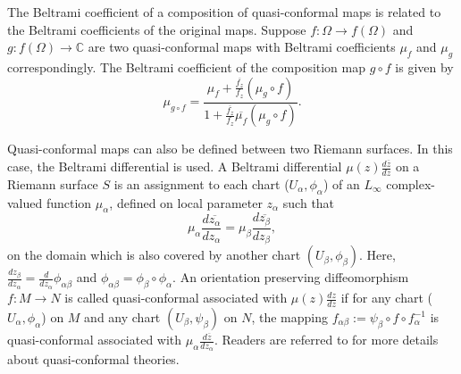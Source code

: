The Beltrami coefficient of a composition of quasi-conformal maps is related to the Beltrami coefficients of the original maps. Suppose $f: \Omega \rightarrow f(\Omega)$ and $g: f(\Omega) \rightarrow \mathbb{C}$ are two quasi-conformal maps with Beltrami coefficients $\mu_f$ and $\mu_g$ correspondingly. The Beltrami coefficient of the composition map $g \circ f$ is given by
$$
\mu_{g \circ f}=\frac{\mu_f+\frac{\overline{f_z}}{f_z}\left(\mu_g \circ f\right)}{1+\frac{\overline{f_z}}{f_z} \overline{\mu_f}\left(\mu_g \circ f\right)} .
$$

Quasi-conformal maps can also be defined between two Riemann surfaces. In this case, the Beltrami differential is used. A Beltrami differential $\mu(z) \frac{d\overline{z}}{d z}$ on a Riemann surface $S$ is an assignment to each chart ($U_\alpha, \phi_\alpha$) of an $L_{\infty}$ complex-valued function $\mu_\alpha$, defined on local parameter $z_\alpha$ such that
$$
\mu_\alpha \frac{d \overline{z_\alpha}}{d z_\alpha}=\mu_\beta \frac{d \overline{z_\beta}}{d z_\beta},
$$
on the domain which is also covered by another chart $\left(U_\beta, \phi_\beta\right)$. Here, $\frac{d z_\beta}{d z_\alpha}=\frac{d}{d z_\alpha} \phi_{\alpha \beta}$ and $\phi_{\alpha \beta}=\phi_\beta \circ \phi_\alpha$. An orientation preserving diffeomorphism $f: M \rightarrow N$ is called quasi-conformal associated with $\mu(z) \frac{d z}{d z}$ if for any chart ($U_\alpha, \phi_\alpha$) on $M$ and any chart $\left(U_\beta, \psi_\beta\right)$ on $N$, the mapping $f_{\alpha \beta}:=\psi_\beta \circ f \circ f_\alpha^{-1}$ is quasi-conformal associated with $\mu_\alpha \frac{d \overline{z}}{d z_\alpha}$. Readers are referred to \cite{gardiner2000quasiconformal,lehto1973quasiconformal} for more details about quasi-conformal theories.